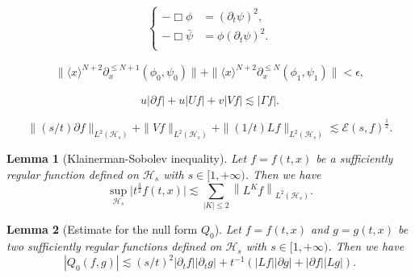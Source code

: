 \documentclass[10pt,a4paper]{amsart}
\newtheorem{lemma}{Lemma}
\def \pt{\partial_{t}}
\begin{document}
\begin{equation}\label{equ:main-new}
    \left\{
    \begin{aligned}
        -\Box \phi&=\left(\pt \psi\right)^{2},
        \\
        -\Box \bar{\psi} &= \phi (\partial_t \psi)^2.
        \\
    \end{aligned}\right.
 \end{equation}

\begin{equation}\label{est:smallness1}
\begin{aligned}
    \|\langle x\rangle^{{N}+2} \partial_x^{\leq N+1} (\phi_0,  \psi_0)\| 
    +  \|\langle x\rangle^{{N}+2} \partial_x^{\leq N} (\phi_1, \psi_1)\|   
    <\epsilon,
    \end{aligned}
\end{equation}

\begin{equation}\label{est:t-rpoint}
   u \left|\partial f\right|+u\left|Uf\right|
   +
    v|Vf|\lesssim |\Gamma f|.
\end{equation}

 \begin{equation}\label{est:L2energy}
     \|(s/t)\partial f\|_{L^{2}(\mathcal{H}_{s})}+\|Vf\|_{L^{2}(\mathcal{H}_{s})}+
      \|(1/t)L f\|_{L^{2}(\mathcal{H}_{s})}\lesssim \mathcal{E}(s,f)^{\frac{1}{2}}.
 \end{equation}

 \begin{lemma}
     [Klainerman-Sobolev inequality]\label{le:Klain}
     Let $f=f(t,x)$ be a {sufficiently }regular function defined on $\mathcal{H}_{s}$ with $s\in  [1,+\infty)$. Then we have 
     \begin{equation*}
         \sup_{\mathcal{H}_{s}}\big|t^{\frac{3}{2}}f(t,x)\big|
         \lesssim \sum_{|K|\le 2}\left\|L^{K}f\right\|_{L^{2}(\mathcal{H}_{s})}.
     \end{equation*}
 \end{lemma}

 \begin{lemma}[Estimate for the null form {$Q_0$}]\label{le:null}
     Let $f=f(t,x)$ and $g=g(t,x)$ be two sufficiently regular functions defined on $\mathcal{H}_{s}$ with $s\in [1,+\infty)$. Then we have 
     \begin{equation*}
         \left|Q_{0}(f,g)\right|\lesssim 
         (s/t)^{2}
         |\partial_{t}f||\partial_{t}g|
         +t^{-1}
         \left(\left|Lf\right|\left|\partial g\right|
         +\left|\partial f\right|\left|L g\right|
         \right).
     \end{equation*}
 \end{lemma}
\end{document}

